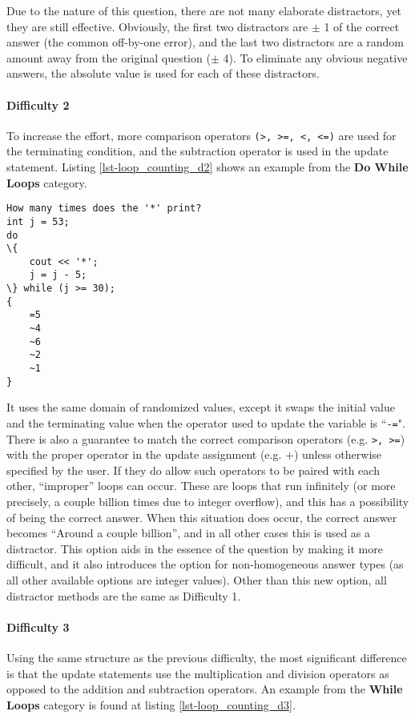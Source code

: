 \documentclass{article}
\begin{document}
Due to the nature of this question, there are not many elaborate distractors, yet they are still effective. Obviously, the first two distractors are $\pm$ 1 of the correct answer (the common 
off-by-one error), and the last two distractors are a random amount away from the original question ($\pm$ 4). To eliminate any obvious negative answers, the absolute value is used for each of these distractors. 

\paragraph{Difficulty 2} \hfill \par
To increase the effort, more comparison operators \verb;(>, >=, <, <=); are used for the terminating condition, and the subtraction operator is used in the update
statement. Listing \ref{lst-loop_counting_d2} shows an example from the \textbf{Do While Loops} category.

\begin{lstlisting}[caption={Loop Counting Difficulty 2 GIFT Example}, label=lst-loop_counting_d2, float]
How many times does the '*' print? 
int j = 53;
do 
\{
	cout << '*'; 
	j = j - 5; 
\} while (j >= 30); 
{
	=5
	~4
	~6
	~2
	~1
}
\end{lstlisting}


 It uses the same domain of randomized values, except it swaps the initial value and the terminating value when the operator used to update the variable is ``\verb;-=;". There is also a 
guarantee to match the correct comparison operators (e.g. \verb;>, >=;) with the proper operator in the update assignment (e.g. +) unless otherwise specified by the user.
If they do allow such operators to be paired with each other, ``improper'' loops can occur. These are loops that run infinitely (or more precisely, a couple billion times due to integer overflow), 
and this has a possibility of being the correct answer. When this situation does occur, the correct answer becomes ``Around a couple billion'', and in all other cases this is used as a distractor. This 
option aids in the essence of the question by making it more difficult, and it also introduces the option for non-homogeneous answer types (as all other available options are integer values). 
Other than this new option, all distractor methods are the same as Difficulty 1.

\paragraph{Difficulty 3} \hfill \par 
Using the same structure as the previous difficulty, the most significant difference is that the update statements use the multiplication and division operators as opposed to the addition
and subtraction operators. An example from the \textbf{While Loops} category is found at listing \ref{lst-loop_counting_d3}.
\end{document}
